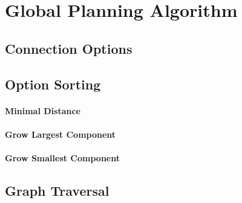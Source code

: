 \section{Global Planning Algorithm}



\subsection{Connection Options}



\subsection{Option Sorting}


\paragraph{Minimal Distance}

\paragraph{Grow Largest Component}

\paragraph{Grow Smallest Component}



\subsection{Graph Traversal}


